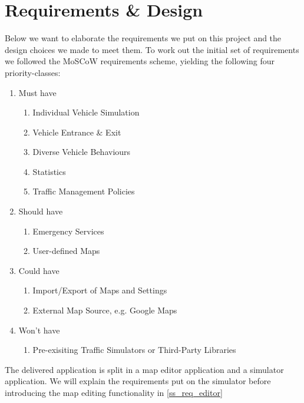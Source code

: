 \section{Requirements \& Design}
Below we want to elaborate the requirements we put on this project and the design choices we made to meet them. To work out the initial set of requirements we followed the MoSCoW requirements scheme, yielding the following four priority-classes:
\begin{enumerate} \itemsep1pt \parskip0pt 
	\item{Must have}
		\begin{enumerate} \itemsep1pt \parskip0pt 
			\item{Individual Vehicle Simulation}
			\item{Vehicle Entrance \& Exit}
			\item{Diverse Vehicle Behaviours}
			\item{Statistics}
			\item{Traffic Management Policies}
		\end{enumerate}
	\item{Should have}
		\begin{enumerate} \itemsep1pt \parskip0pt 
			\item{Emergency Services}
			\item{User-defined Maps}
		\end{enumerate}
	\item{Could have}
		\begin{enumerate} \itemsep1pt \parskip0pt 
			\item{Import/Export of Maps and Settings}
			\item{External Map Source, e.g. Google Maps}
		\end{enumerate}
	\item{Won't have}
		\begin{enumerate} \itemsep1pt \parskip0pt 
			\item{Pre-exisiting Traffic Simulators or Third-Party Libraries}
		\end{enumerate}
\end{enumerate}

The delivered application is split in a map editor application and a simulator application. We will explain the requirements put on the simulator before introducing the map editing functionality in \ref{ss_req_editor}

